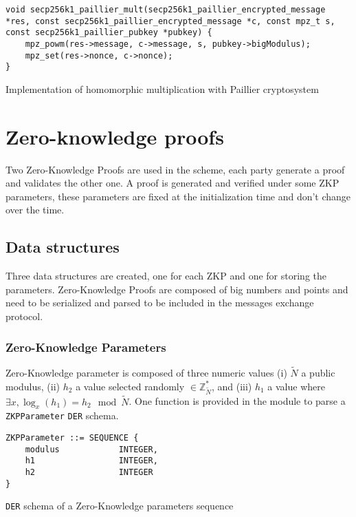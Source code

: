 \begin{listing}
  \begin{verbatim}
void secp256k1_paillier_mult(secp256k1_paillier_encrypted_message *res, const secp256k1_paillier_encrypted_message *c, const mpz_t s, const secp256k1_paillier_pubkey *pubkey) {
    mpz_powm(res->message, c->message, s, pubkey->bigModulus);
    mpz_set(res->nonce, c->nonce);
}
  \end{verbatim}
	\caption{Implementation of homomorphic multiplication with Paillier cryptosystem}
	\label{lst:implHomomorphMulPaillier}
\end{listing}


\section{Zero-knowledge proofs}

Two Zero-Knowledge Proofs are used in the scheme, each party generate a proof
and validates the other one. A proof is generated and verified under some ZKP
parameters, these parameters are fixed at the initialization time and don't
change over the time.

\subsection{Data structures}

Three data structures are created, one for each ZKP and one for storing the
parameters. Zero-Knowledge Proofs are composed of big numbers and points and
need to be serialized and parsed to be included in the messages exchange
protocol.

\subsubsection{Zero-Knowledge Parameters}

Zero-Knowledge parameter is composed of three numeric values (i) $\tilde{N}$ a
public modulus, (ii) $h_2$ a value selected randomly $\in
\mathbb{Z}_{\tilde{N}}^*$, and (iii) $h_1$ a value where $\exists x, \log_x(h_1) =
h_2 \mod \tilde{N}$. One function is provided in the module to parse a
\texttt{ZKPParameter} \texttt{DER} schema.

\begin{listing}
  \begin{verbatim}
ZKPParameter ::= SEQUENCE {
    modulus            INTEGER,
    h1                 INTEGER,
    h2                 INTEGER
}
  \end{verbatim}
	\caption{\texttt{DER} schema of a Zero-Knowledge parameters sequence}
	\label{lst:DERSchemaZKPParams}
\end{listing}

